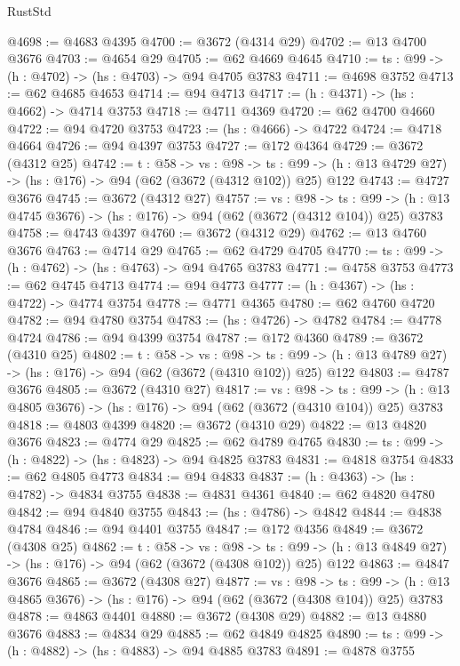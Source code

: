 \begin{lexlean}{RustStd}
\begin{coremodule}
{\begin{coremodule}
{{{{{{{{{@4698 := @4683 @4395
@4700 := @3672 (@4314 @29)
@4702 := @13 @4700 @3676
@4703 := @4654 @29
@4705 := @62 @4669 @4645
@4710 := {ts : @99} -> (h : @4702) -> (hs : @4703) -> @94 @4705 @3783
@4711 := @4698 @3752
@4713 := @62 @4685 @4653
@4714 := @94 @4713
@4717 := (h : @4371) -> (hs : @4662) -> @4714 @3753
@4718 := @4711 @4369
@4720 := @62 @4700 @4660
@4722 := @94 @4720 @3753
@4723 := (hs : @4666) -> @4722
@4724 := @4718 @4664
@4726 := @94 @4397 @3753
@4727 := @172 @4364
@4729 := @3672 (@4312 @25)
@4742 := {t : @58} ->
  {vs : @98} ->
  {ts : @99} -> (h : @13 @4729 @27) -> (hs : @176) -> @94 (@62 (@3672 (@4312 @102)) @25) @122
@4743 := @4727 @3676
@4745 := @3672 (@4312 @27)
@4757 := {vs : @98} ->
  {ts : @99} -> (h : @13 @4745 @3676) -> (hs : @176) -> @94 (@62 (@3672 (@4312 @104)) @25) @3783
@4758 := @4743 @4397
@4760 := @3672 (@4312 @29)
@4762 := @13 @4760 @3676
@4763 := @4714 @29
@4765 := @62 @4729 @4705
@4770 := {ts : @99} -> (h : @4762) -> (hs : @4763) -> @94 @4765 @3783
@4771 := @4758 @3753
@4773 := @62 @4745 @4713
@4774 := @94 @4773
@4777 := (h : @4367) -> (hs : @4722) -> @4774 @3754
@4778 := @4771 @4365
@4780 := @62 @4760 @4720
@4782 := @94 @4780 @3754
@4783 := (hs : @4726) -> @4782
@4784 := @4778 @4724
@4786 := @94 @4399 @3754
@4787 := @172 @4360
@4789 := @3672 (@4310 @25)
@4802 := {t : @58} ->
  {vs : @98} ->
  {ts : @99} -> (h : @13 @4789 @27) -> (hs : @176) -> @94 (@62 (@3672 (@4310 @102)) @25) @122
@4803 := @4787 @3676
@4805 := @3672 (@4310 @27)
@4817 := {vs : @98} ->
  {ts : @99} -> (h : @13 @4805 @3676) -> (hs : @176) -> @94 (@62 (@3672 (@4310 @104)) @25) @3783
@4818 := @4803 @4399
@4820 := @3672 (@4310 @29)
@4822 := @13 @4820 @3676
@4823 := @4774 @29
@4825 := @62 @4789 @4765
@4830 := {ts : @99} -> (h : @4822) -> (hs : @4823) -> @94 @4825 @3783
@4831 := @4818 @3754
@4833 := @62 @4805 @4773
@4834 := @94 @4833
@4837 := (h : @4363) -> (hs : @4782) -> @4834 @3755
@4838 := @4831 @4361
@4840 := @62 @4820 @4780
@4842 := @94 @4840 @3755
@4843 := (hs : @4786) -> @4842
@4844 := @4838 @4784
@4846 := @94 @4401 @3755
@4847 := @172 @4356
@4849 := @3672 (@4308 @25)
@4862 := {t : @58} ->
  {vs : @98} ->
  {ts : @99} -> (h : @13 @4849 @27) -> (hs : @176) -> @94 (@62 (@3672 (@4308 @102)) @25) @122
@4863 := @4847 @3676
@4865 := @3672 (@4308 @27)
@4877 := {vs : @98} ->
  {ts : @99} -> (h : @13 @4865 @3676) -> (hs : @176) -> @94 (@62 (@3672 (@4308 @104)) @25) @3783
@4878 := @4863 @4401
@4880 := @3672 (@4308 @29)
@4882 := @13 @4880 @3676
@4883 := @4834 @29
@4885 := @62 @4849 @4825
@4890 := {ts : @99} -> (h : @4882) -> (hs : @4883) -> @94 @4885 @3783
@4891 := @4878 @3755
}}}}}}}}}
\end{coremodule}}
\end{coremodule}
\end{lexlean}
